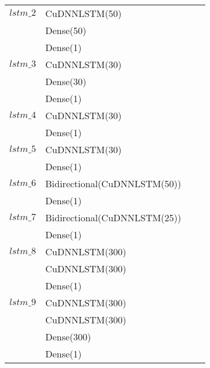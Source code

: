 \begin{longtable}{| c | m{0.58\linewidth} | r | m{0.1\linewidth} |}
    $lstm\_2$   & CuDNNLSTM(50)                 \\
                & Dense(50)                     \\
                & Dense(1)                      \\ \hline

    $lstm\_3$   & CuDNNLSTM(30)                 \\
                & Dense(30)                     \\
                & Dense(1)                      \\ \hline
    $lstm\_4$   & CuDNNLSTM(30)                 \\
                & Dense(1)                      \\ \hline
    $lstm\_5$   & CuDNNLSTM(30)                 \\
                & Dense(1)                      \\ \hline
    $lstm\_6$   & Bidirectional(CuDNNLSTM(50))  \\
                & Dense(1)                      \\ \hline
    $lstm\_7$   & Bidirectional(CuDNNLSTM(25))  \\
                & Dense(1)                      \\ \hline


    $lstm\_8$   & CuDNNLSTM(300)                \\
                & CuDNNLSTM(300)                \\
                & Dense(1)                      \\ \hline

    $lstm\_9$   & CuDNNLSTM(300)                \\
                & CuDNNLSTM(300)                \\
                & Dense(300)                    \\
                & Dense(1)                      \\ \hline


\end{longtable}
